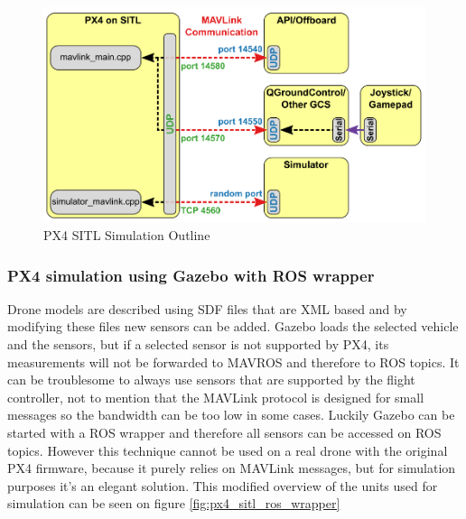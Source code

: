 \begin{figure}[h]
    \centering
    \includegraphics[width=120mm, keepaspectratio]{figures/px4_sitl_overview.png}
    \caption{PX4 SITL Simulation Outline \cite{PX4Simulation}}
    \label{fig:px4_sitl_simulation}
\end{figure}

\subsubsection{PX4 simulation using Gazebo with ROS wrapper}

Drone models are described using SDF files that are XML based and by modifying these files new sensors can 
be added. Gazebo loads the selected vehicle and the sensors, but if a selected sensor is not supported by
PX4, its measurements will not be forwarded to MAVROS and therefore to ROS topics. It can be troublesome 
to always use sensors that are supported by the flight controller, not to mention that the MAVLink protocol 
is designed for small messages so the bandwidth can be too low in some cases. Luckily Gazebo can 
be started with a ROS wrapper and therefore all sensors can be accessed on ROS topics. However this technique
cannot be used on a real drone with the original PX4 firmware, because it purely relies on MAVLink messages, 
but for simulation purposes it's an elegant solution. This modified overview of the units used for simulation
can be seen on figure \ref{fig:px4_sitl_ros_wrapper}

